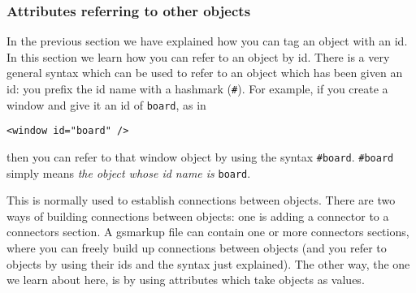 \subsubsection{Attributes referring to other objects}
In the previous section we have explained how you can tag an object
with an id.  In this section we learn how you can refer to an object
by id.  There is a very general syntax which can be used to refer to
an object which has been given an id: you prefix the id name with a
hashmark (\texttt{\#}).  For example, if you create a window and give
it an id of \texttt{board}, as in
\begin{verbatim}
<window id="board" />
\end{verbatim}
then you can refer to that window object by using the syntax
\texttt{\#board}.  \texttt{\#board} simply means {\it the object whose id name 
is} \texttt{board}.

This is normally used to establish connections between objects.  There
are two ways of building connections between objects: one is adding a
connector to a connectors section.  A gsmarkup file can contain one or
more connectors sections, where you can freely build up connections
between objects (and you refer to objects by using their ids and the
syntax just explained).  The other way, the one we learn about here,
is by using attributes which take objects as values.


